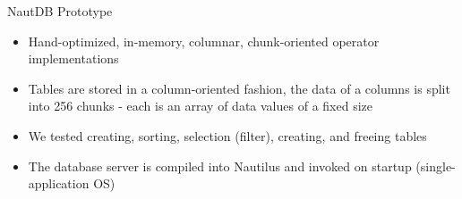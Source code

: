 \begin{block}{NautDB Prototype}
  \begin{itemize}

  \item Hand-optimized, in-memory, columnar, chunk-oriented operator
    implementations

  \item Tables are stored in a column-oriented fashion, the data of a
    columns is split into 256 chunks - each is an array of data values
    of a fixed size

  \item We tested creating, sorting, selection (filter), creating, and
    freeing tables

  \item The database server is compiled into Nautilus and invoked on
    startup (single-application OS)




  \end{itemize}
\end{block}

